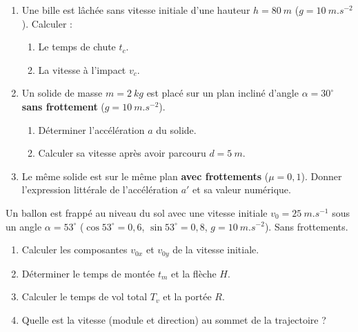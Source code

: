 \documentclass[11pt]{article}
\begin{document}
\begin{exercice}
\begin{enumerate}
    \item Une bille est lâchée sans vitesse initiale d'une hauteur $h = \SI{80}{m}$ ($g=\SI{10}{m.s^{-2}}$). Calculer : 
    \begin{enumerate}
        \item Le temps de chute $t_c$.
        \item La vitesse à l'impact $v_c$.
    \end{enumerate}
    \item Un solide de masse $m = \SI{2}{kg}$ est placé sur un plan incliné d'angle $\alpha = 30^\circ$ \textbf{sans frottement} ($g=\SI{10}{m.s^{-2}}$). 
    \begin{enumerate}
        \item Déterminer l'accélération $a$ du solide.
        \item Calculer sa vitesse après avoir parcouru $d = \SI{5}{m}$.
    \end{enumerate}
    \item Le même solide est sur le même plan \textbf{avec frottements} ($\mu = 0,1$). Donner l'expression littérale de l'accélération $a'$ et sa valeur numérique.
\end{enumerate}
\end{exercice}

\begin{exercice}
Un ballon est frappé au niveau du sol avec une vitesse initiale $v_0 = \SI{25}{m.s^{-1}}$ sous un angle $\alpha = 53^\circ$ ($\cos 53^\circ = 0,6$, $\sin 53^\circ = 0,8$, $g=\SI{10}{m.s^{-2}}$). Sans frottements.
\begin{enumerate}
    \item Calculer les composantes $v_{0x}$ et $v_{0y}$ de la vitesse initiale.
    \item Déterminer le temps de montée $t_m$ et la flèche $H$.
    \item Calculer le temps de vol total $T_v$ et la portée $R$.
    \item Quelle est la vitesse (module et direction) au sommet de la trajectoire ?
\end{enumerate}
\end{exercice}
\end{document}
